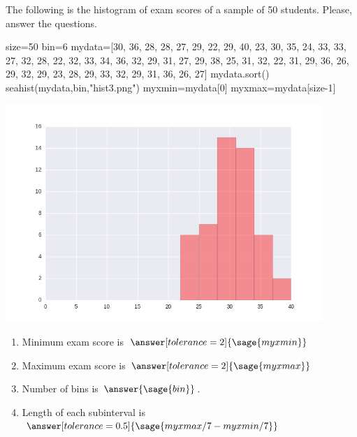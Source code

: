 \documentclass{ximera}
\begin{document}
\begin{problem}
The following is the histogram of exam scores of a sample of 50 students. Please, answer the questions.

\begin{sagesilent}
size=50
bin=6
mydata=[30, 36, 28, 28, 27, 29, 22, 29, 40, 23, 30, 35, 24, 33, 33, 27, 32,
       28, 22, 32, 33, 34, 36, 32, 29, 31, 27, 29, 38, 25, 31, 32, 22, 31,
       29, 36, 26, 29, 32, 29, 23, 28, 29, 33, 32, 29, 31, 36, 26, 27]
mydata.sort()    
seahist(mydata,bin,"hist3.png")
myxmin=mydata[0]
myxmax=mydata[size-1]
\end{sagesilent}

\includegraphics[width=12cm]{hist3.png}

\begin{enumerate}
    \item Minimum exam score is $\answer[tolerance=2]{\sage{myxmin}}$
    \item Maximum exam score is $\answer[tolerance=2]{\sage{myxmax}}$
    \item Number of bins is $\answer{\sage{bin}}$.
    \item Length of each subinterval is $\answer[tolerance=0.5]{\sage{myxmax/7-myxmin/7}}$
\end{enumerate}
\end{problem}
\end{document}
